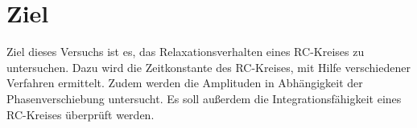 \section{Ziel}
Ziel dieses Versuchs ist es, das Relaxationsverhalten eines RC-Kreises zu untersuchen.
Dazu wird die Zeitkonstante des RC-Kreises, mit Hilfe verschiedener Verfahren ermittelt. 
Zudem werden die Amplituden in Abhängigkeit der Phasenverschiebung untersucht. 
Es soll außerdem die Integrationsfähigkeit eines RC-Kreises überprüft werden.